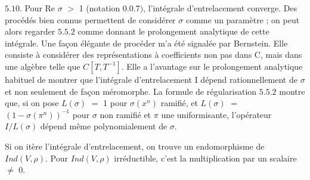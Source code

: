 \documentclass[10pt,a4paper]{article}
\begin{document}
\par $5.10$. Pour Re $\sigma{}$ $>$ 1 (notation $0.0.7)$, l'intégrale d'entrelacement converge. Des procédés bien connus permettent de considérer $\sigma{}$ comme un paramètre ; on peut alors regarder $5.5.2$ comme donnant le prolongement analytique de cette intégrale. Une façon élégante de procéder m'a été signalée par Bernstein. Elle consiste à considérer des représentations à coefficients non pas dans C, mais dans une algèbre telle que $C[T,T^{-1}]$. Elle a l'avantage sur le prolongement analytique habituel de montrer que l'intégrale d'entrelacement I dépend rationnellement de $\sigma{}$ et non seulement de façon méromorphe. La formule de régularisation $5.5.2$ montre que, si on pose $L(\sigma{})$ $=$ 1 pour $\sigma{}(x^n)$ ramifié, et $L(\sigma{})$ $=$ $(1-\sigma{}(\pi{}^n))^{-1}$ pour $\sigma{}$ non ramifié et $\pi{}$ une uniformisante, l'opérateur $I/L(\sigma{})$ dépend même polynomialement de $\sigma{}$.\par
\par Si on itère l'intégrale d'entrelacement, on trouve un endomorphisme de $Ind(V,\rho{})$. Pour $Ind(V,\rho{})$ irréductible, c'est la multiplication par un scalaire $\ne{}$ 0.\par
\end{document}
